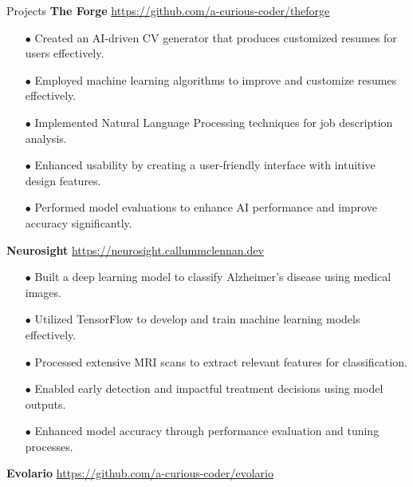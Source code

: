 \begin{rSection}{Projects}
\vspace{0.12cm}
{\bf The Forge}
\hspace{2 cm}{Python, AI, Machine Learning}
\hfill{\href{https://github.com/a-curious-coder/theforge}{https://github.com/a-curious-coder/theforge}}
\begin{itemize}[label=\myfancylabel, leftmargin=0.5cm, topsep=-5pt, itemsep=-1ex]
\setlength\itemsep{-0.25cm}
    \item[$\bullet$] Created an AI-driven CV generator that produces customized resumes for users effectively.
    \item[$\bullet$] Employed machine learning algorithms to improve and customize resumes effectively.
    \item[$\bullet$] Implemented Natural Language Processing techniques for job description analysis.
    \item[$\bullet$] Enhanced usability by creating a user-friendly interface with intuitive design features.
    \item[$\bullet$] Performed model evaluations to enhance AI performance and improve accuracy significantly.
\end{itemize}
\vspace{0.4cm}
{\bf Neurosight}
\hspace{2 cm}{Python, Deep Learning, TensorFlow}
\hfill{\href{https://neurosight.callummclennan.dev}{https://neurosight.callummclennan.dev}}
\begin{itemize}[label=\myfancylabel, leftmargin=0.5cm, topsep=-5pt, itemsep=-1ex]
\setlength\itemsep{-0.25cm}
    \item[$\bullet$] Built a deep learning model to classify Alzheimer's disease using medical images.
    \item[$\bullet$] Utilized TensorFlow to develop and train machine learning models effectively.
    \item[$\bullet$] Processed extensive MRI scans to extract relevant features for classification.
    \item[$\bullet$] Enabled early detection and impactful treatment decisions using model outputs.
    \item[$\bullet$] Enhanced model accuracy through performance evaluation and tuning processes.
\end{itemize}
\vspace{0.4cm}
{\bf Evolario}
\hspace{2 cm}{Python, Game Development, AI}
\hfill{\href{https://github.com/a-curious-coder/evolario}{https://github.com/a-curious-coder/evolario}}

\end{rSection}
